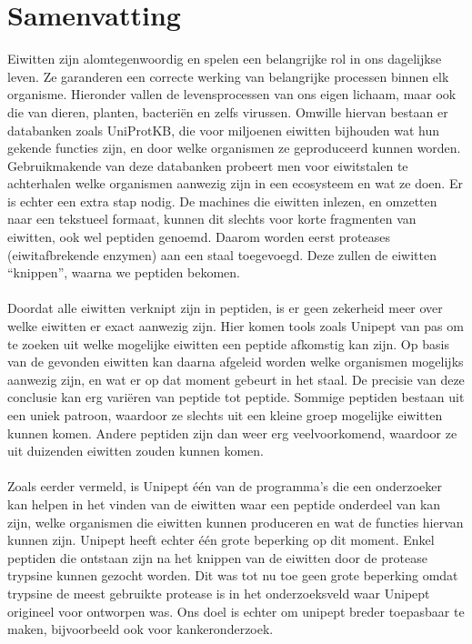\chapter*{Samenvatting}
Eiwitten zijn alomtegenwoordig en spelen een belangrijke rol in ons dagelijkse leven.
Ze garanderen een correcte werking van belangrijke processen binnen elk organisme.
Hieronder vallen de levensprocessen van ons eigen lichaam, maar ook die van dieren, planten, bacteriën en zelfs virussen.
Omwille hiervan bestaan er databanken zoals UniProtKB, die voor miljoenen eiwitten bijhouden wat hun gekende functies zijn, en door welke organismen ze geproduceerd kunnen worden.
Gebruikmakende van deze databanken probeert men voor eiwitstalen te achterhalen welke organismen aanwezig zijn in een ecosysteem en wat ze doen.
Er is echter een extra stap nodig.
De machines die eiwitten inlezen, en omzetten naar een tekstueel formaat, kunnen dit slechts voor korte fragmenten van eiwitten, ook wel peptiden genoemd.
Daarom worden eerst proteases (eiwitafbrekende enzymen) aan een staal toegevoegd.
Deze zullen de eiwitten ``knippen'', waarna we peptiden bekomen.
\\ \\
Doordat alle eiwitten verknipt zijn in peptiden, is er geen zekerheid meer over welke eiwitten er exact aanwezig zijn.
Hier komen tools zoals Unipept van pas om te zoeken uit welke mogelijke eiwitten een peptide afkomstig kan zijn.
Op basis van de gevonden eiwitten kan daarna afgeleid worden welke organismen mogelijks aanwezig zijn, en wat er op dat moment gebeurt in het staal.
De precisie van deze conclusie kan erg variëren van peptide tot peptide.
Sommige peptiden bestaan uit een uniek patroon, waardoor ze slechts uit een kleine groep mogelijke eiwitten kunnen komen.
Andere peptiden zijn dan weer erg veelvoorkomend, waardoor ze uit duizenden eiwitten zouden kunnen komen.
\\ \\
Zoals eerder vermeld, is Unipept één van de programma's die een onderzoeker kan helpen in het vinden van de eiwitten waar een peptide onderdeel van kan zijn, welke organismen die eiwitten kunnen produceren en wat de functies hiervan kunnen zijn.
Unipept heeft echter één grote beperking op dit moment.
Enkel peptiden die ontstaan zijn na het knippen van de eiwitten door de protease trypsine kunnen gezocht worden.
Dit was tot nu toe geen grote beperking omdat trypsine de meest gebruikte protease is in het onderzoeksveld waar Unipept origineel voor ontworpen was.
Ons doel is echter om unipept breder toepasbaar te maken, bijvoorbeeld ook voor kankeronderzoek.
